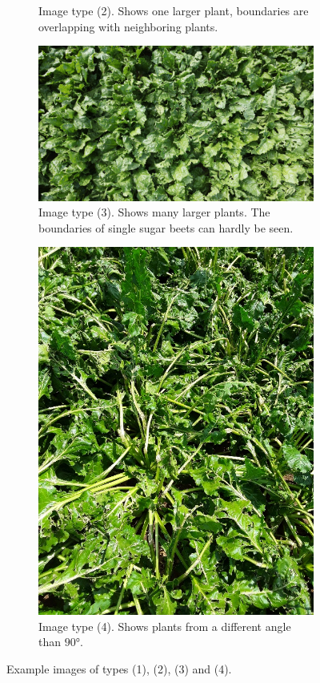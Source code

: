 \begin{figure}[htb!]
\begin{subfigure}{.4\textwidth}
		\caption{Image type (2). Shows one larger plant, boundaries are overlapping with neighboring plants.}
		\label{fig:type_2}
	\end{subfigure}
	\begin{subfigure}{.6\textwidth}
		\centering
		\includegraphics[scale=0.13]{figures/type_4.png}
		\caption{Image type (3). Shows many larger plants. The boundaries of single sugar beets can hardly be seen.}
		\label{fig:type_3}
	\end{subfigure}
	\begin{subfigure}{.4\textwidth}
	\centering
	\includegraphics[scale=0.21]{figures/type_3.jpg}
	\caption{Image type (4). Shows plants from a different angle than $ 90° $.}
	\label{fig:type_4}
	\end{subfigure}
	\caption{Example images of types (1), (2), (3) and (4).}
	\label{fig:image_types}
\end{figure}

